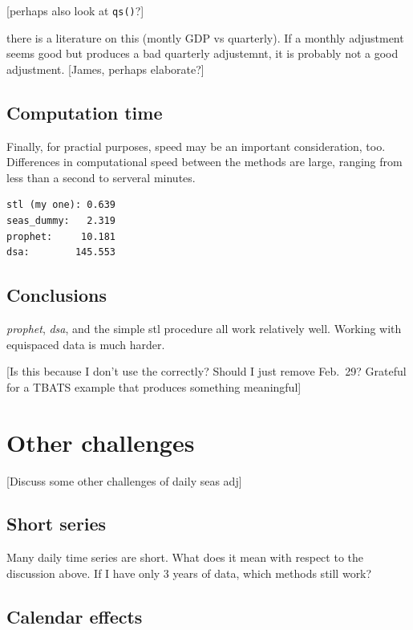 {[}perhaps also look at \texttt{qs()}?{]}

there is a literature on this (montly GDP vs quarterly). If a monthly
adjustment seems good but produces a bad quarterly adjustemnt, it is
probably not a good adjustment. {[}James, perhaps elaborate?{]}

\hypertarget{computation-time}{%
\subsection{Computation time}\label{computation-time}}

Finally, for practial purposes, speed may be an important consideration,
too. Differences in computational speed between the methods are large,
ranging from less than a second to serveral minutes.

\begin{verbatim}
stl (my one): 0.639
seas_dummy:   2.319
prophet:     10.181
dsa:        145.553
\end{verbatim}

\hypertarget{conclusions}{%
\subsection{Conclusions}\label{conclusions}}

\emph{prophet}, \emph{dsa}, and the simple stl procedure all work
relatively well. Working with equispaced data is much harder.

{[}Is this because I don't use the correctly? Should I just remove
Feb.~29? Grateful for a TBATS example that produces something
meaningful{]}

\hypertarget{other-challenges}{%
\section{Other challenges}\label{other-challenges}}

{[}Discuss some other challenges of daily seas adj{]}

\hypertarget{short-series}{%
\subsection{Short series}\label{short-series}}

Many daily time series are short. What does it mean with respect to the
discussion above. If I have only 3 years of data, which methods still
work?

\hypertarget{calendar-effects}{%
\subsection{Calendar effects}\label{calendar-effects}}

